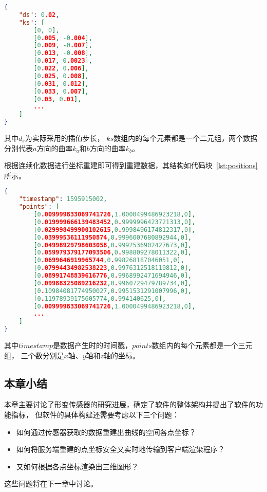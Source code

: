 \begin{lstlisting}[language=json,firstnumber=1,label={lst:curvature-vec},caption={插值曲率数据样例}]
{
    "ds": 0.02,
    "ks": [
        [0, 0],
        [0.005, -0.004],
        [0.009, -0.007],
        [0.013, -0.008],
        [0.017, 0.0023],
        [0.022, 0.006],
        [0.025, 0.008],
        [0.031, 0.012],
        [0.033, 0.007],
        [0.03, 0.01],
        ...
    ]
}
\end{lstlisting}

其中$d_s$为实际采用的插值步长，
$ks$数组内的每个元素都是一个二元组，两个数据分别代表$a$方向的曲率$k_a$和$b$方向的曲率$k_b$。

根据连续化数据进行坐标重建即可得到重建数据，其结构如代码块~\ref{lst:positions}所示。

\begin{lstlisting}[language=json,firstnumber=1,label={lst:positions},caption={重建坐标点数据样例}]
{
    "timestamp": 1595915002,
    "points": [
        [0.009999833069741726,1.0000499486923218,0],
        [0.019999666139483452,0.9999996423721313,0],
        [0.029998499900102615,0.9998496174812317,0],
        [0.03999536111950874,0.9996007680892944,0],
        [0.04998929798603058,0.9992536902427673,0],
        [0.059979379177093506,0.998809278011322,0],
        [0.0699646919965744,0.998268187046051,0],
        [0.07994434982538223,0.9976312518119812,0],
        [0.08991748839616776,0.9968992471694946,0],
        [0.09988325089216232,0.9960729479789734,0],
        [0.10984081774950027,0.9951531291007996,0],
        [0.11978939175605774,0.994140625,0],
        [0.009999833069741726,1.0000499486923218,0],
        ...
    ]
}
\end{lstlisting}

其中$timestamp$是数据产生时的时间戳，$points$数组内的每个元素都是一个三元组，
三个数分别是$x$轴、$y$轴和$z$轴的坐标。
\FloatBarrier
\subsection{本章小结}
本章主要讨论了形变传感器的研究进展，确定了软件的整体架构并提出了软件的功能指标，
但软件的具体构建还需要考虑以下三个问题：

\begin{itemize}
\item 如何通过传感器获取的数据重建出曲线的空间各点坐标？
\item 如何将服务端重建的点坐标安全又实时地传输到客户端渲染程序？
\item 又如何根据各点坐标渲染出三维图形？
\end{itemize}

这些问题将在下一章中讨论。
